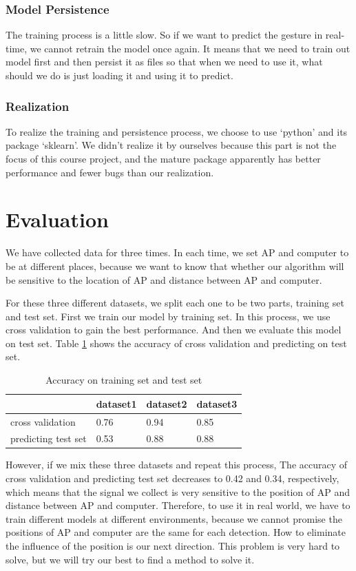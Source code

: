 \documentclass[conference]{IEEEtran}
\begin{document}
\subsubsection{Model Persistence}
The training process is a little slow. So if we want to predict the gesture in real-time, we cannot retrain the model once again. It means that we need to train out model first and then persist it as files so that when we need to use it, what should we do is just loading it and using it to predict.

\subsubsection{Realization}
To realize the training and persistence process, we choose to use `python' and its package `sklearn'. We didn't realize it by ourselves because this part is not the focus of this course project, and the mature package apparently has better performance and fewer bugs than our realization. 
\section{Evaluation} \label{section-evaluation}
We have collected data for three times. In each time, we set AP and computer to be at different places, because we want to know that whether our algorithm will be sensitive to the location of AP and distance between AP and computer.

For these three different datasets, we split each one to be two parts, training set and test set. First we train our model by training set. In this process, we use cross validation to gain the best performance. And then we evaluate this model on test set. Table \ref{result} shows the accuracy of cross validation and predicting on test set.

\begin{table}[]
\centering
\caption{Accuracy on training set and test set}
\label{result}
\begin{tabular}{|l|l|l|l|}
 \hline
 & dataset1 & dataset2 & dataset3 \\
 \hline
cross validation & 0.76 & 0.94 & 0.85 \\
\hline
predicting test set & 0.53 & 0.88 & 0.88 \\
 \hline
\end{tabular}
\end{table}

However, if we mix these three datasets and repeat this process, The accuracy of cross validation and predicting test set decreases to 0.42 and 0.34, respectively, which means that the signal we collect is very sensitive to the position of AP and distance between AP and computer. 
Therefore, to use it in real world, we have to train different models at different environments, because we cannot promise the positions of AP and computer are the same for each detection. How to eliminate the influence of the position is our next direction. This problem is very hard to solve, but we will try our best to find a method to solve it.
\end{document}
